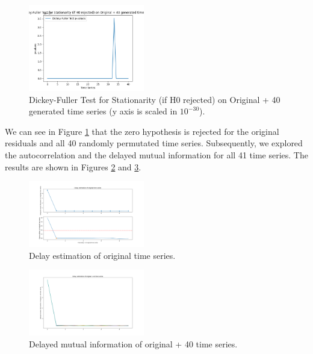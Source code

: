 \documentclass[conference]{IEEEtran}
\begin{document}
\begin{figure}[ht]
    \centering
    \includegraphics[width=0.45\textwidth]{Figures/AirportNonLin/Dickey-Fuller Test for Stationarity (if H0 rejected) on Original + 40 generated time series.png}
    \caption{Dickey-Fuller Test for Stationarity (if H0 rejected) on Original + 40 generated time series (y axis is scaled in $10^{-30}$).}
    \label{adfa}
\end{figure}

We can see in Figure \ref{adfa} that the zero hypothesis is rejected for the original residuals and all 40 randomly permutated time series. Subsequently, we explored the autocorrelation and the delayed mutual information for all 41 time series. The results are shown in Figures \ref{dela} and \ref{mia}. 

\begin{figure}[ht]
    \centering
    \includegraphics[width=0.45\textwidth]{Figures/AirportNonLin/Delay estimation of original time series.png}
    \caption{Delay estimation of original time series.}
    \label{dela}
\end{figure}

\begin{figure}[ht]
    \centering
    \includegraphics[width=0.45\textwidth]{Figures/AirportNonLin/Delay estimation of original + 40 time series.png}
    \caption{Delayed mutual information of original + 40 time series.}
    \label{mia}
\end{figure}
\end{document}
